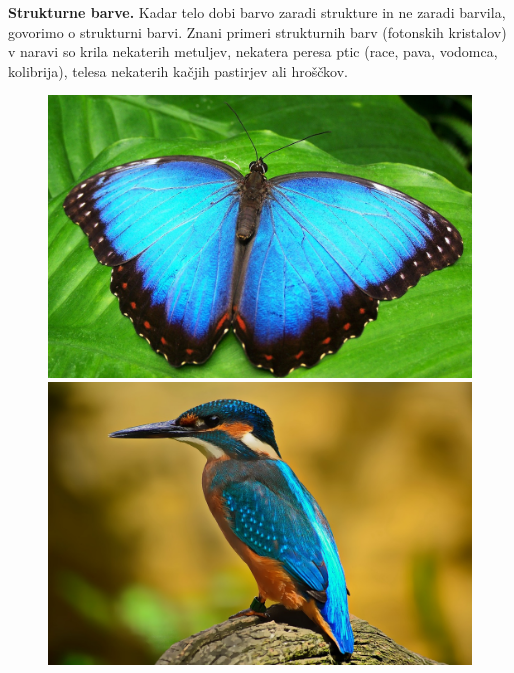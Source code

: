 \begin{example}{\bf Strukturne barve.}
Kadar telo dobi barvo zaradi strukture in ne zaradi barvila, govorimo o strukturni barvi. 
Znani primeri strukturnih barv (fotonskih kristalov) v naravi so krila nekaterih metuljev, 
nekatera peresa ptic (race, pava, vodomca, kolibrija), telesa nekaterih kačjih pastirjev ali hroščkov. 
\begin{figure}[!ht]
\centering
\includegraphics[width=7truecm]{slike/06_metulj.jpg}\hfill
\includegraphics[width=7truecm]{slike/06_vodomec.jpg}\newline


\end{figure}
\end{example}
